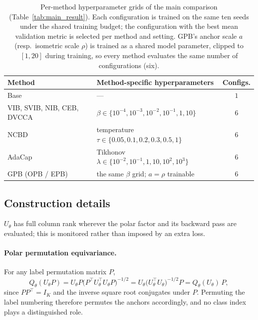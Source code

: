 \begin{table}[t]
\centering\small
\setlength{\tabcolsep}{3pt}
\caption{Per-method hyperparameter grids of the main comparison
(Table~\ref{tab:main_result}). Each configuration is trained on the same
ten seeds under the shared training budget; the configuration with the
best mean validation metric is selected per method and setting. GPB's
anchor scale $a$ (resp.\ isometric scale $\rho$) is trained as a shared
model parameter, clipped to $[1,20]$ during training, so every method
evaluates the same number of configurations (six).}
\label{tab:search-protocol}
\begin{tabular}{l l c}
\hline
Method & Method-specific hyperparameters & Configs. \\
\hline
Base & --- & $1$ \\
VIB, SVIB, NIB, CEB, DVCCA & $\beta\in\{10^{-4},10^{-3},10^{-2},10^{-1},1,10\}$ & $6$ \\
NCBD & temperature $\tau\in\{0.05,0.1,0.2,0.3,0.5,1\}$ & $6$ \\
AdaCap & Tikhonov $\lambda\in\{10^{-2},10^{-1},1,10,10^{2},10^{3}\}$ & $6$ \\
GPB (OPB / EPB) & the same $\beta$ grid; $a=\rho$ trainable & $6$ \\
\hline
\end{tabular}
\end{table}

\subsection{Construction details}
\label{app:construction}

\begin{assumption}
\label{ass:fullrank}
$U_\theta$ has full column rank wherever the polar factor and its backward pass are
evaluated; this is monitored rather than imposed by an extra loss.
\end{assumption}

\paragraph{Polar permutation equivariance.} For any label permutation matrix $P$,
\begin{equation}
Q_\theta(U_\theta P)
= U_\theta P \bigl( P^{\top} U_\theta^{\top} U_\theta P \bigr)^{-1/2}
= U_\theta \bigl( U_\theta^{\top} U_\theta \bigr)^{-1/2} P
= Q_\theta(U_\theta)\, P ,
\label{eq:opb-equivariance}
\end{equation}
since $P P^{\top} = I_K$ and the inverse square root conjugates under $P$. Permuting
the label numbering therefore permutes the anchors accordingly, and no class index
plays a distinguished role.

